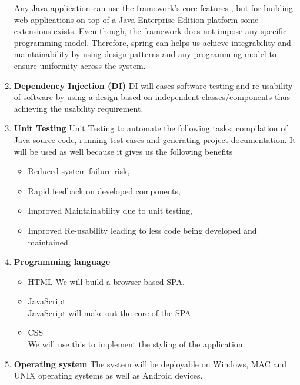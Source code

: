 \documentclass[a4paper,10pt]{article}
\begin{document}
\begin{enumerate}
	Any Java application can use the framework's core features , but for building web applications on top of a Java Enterprise Edition platform some extensions exists. Even though, the framework does not impose any specific programming model. 
	Therefore, spring can helps us achieve integrability and maintainability by using design patterns and any programming model to ensure uniformity across the system.
	
	\item \textbf{Dependency Injection (DI)}
	DI will eases software testing and re-usability of software by using a design based on independent classes/components thus achieving the usability requirement.

	\item \textbf{Unit Testing}
	Unit Testing to automate the following tasks: compilation of Java source code, running test cases and generating project documentation. It will be used as well because it gives us the following benefits
		\begin{itemize}
			\item Reduced system failure risk,
			\item Rapid feedback on developed components,
			\item Improved Maintainability due to unit testing,
			\item Improved Re-usability leading to less code being developed and maintained.
		\end{itemize}
		
	\item \textbf{Programming language}
		\begin{itemize}
		\item HTML
		We will build a browser based SPA.
		\item JavaScript\\
		JavaScript will make out the core of the SPA.
		\item CSS\\
		We will use this to implement the styling of the application.
	\end{itemize}
	\item \textbf{Operating system}
	The system will be deployable on Windows, MAC and UNIX operating systems as well as Android devices.
\end{enumerate}
\end{document}
